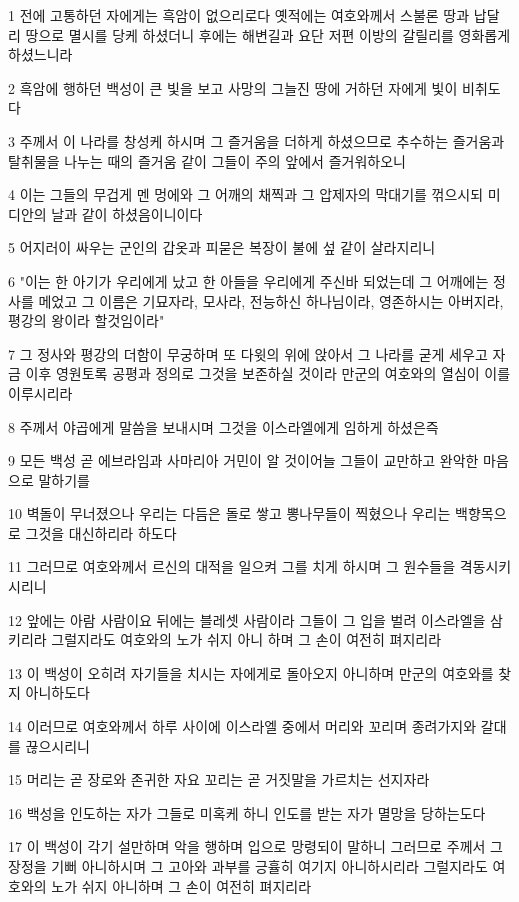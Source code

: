 \par 1 전에 고통하던 자에게는 흑암이 없으리로다 옛적에는 여호와께서 스불론 땅과 납달리 땅으로 멸시를 당케 하셨더니 후에는 해변길과 요단 저편 이방의 갈릴리를 영화롭게 하셨느니라
\par 2 흑암에 행하던 백성이 큰 빛을 보고 사망의 그늘진 땅에 거하던 자에게 빛이 비취도다
\par 3 주께서 이 나라를 창성케 하시며 그 즐거움을 더하게 하셨으므로 추수하는 즐거움과 탈취물을 나누는 때의 즐거움 같이 그들이 주의 앞에서 즐거워하오니
\par 4 이는 그들의 무겁게 멘 멍에와 그 어깨의 채찍과 그 압제자의 막대기를 꺾으시되 미디안의 날과 같이 하셨음이니이다
\par 5 어지러이 싸우는 군인의 갑옷과 피묻은 복장이 불에 섶 같이 살라지리니
\par 6 "이는 한 아기가 우리에게 났고 한 아들을 우리에게 주신바 되었는데 그 어깨에는 정사를 메었고 그 이름은 기묘자라, 모사라, 전능하신 하나님이라, 영존하시는 아버지라, 평강의 왕이라 할것임이라"
\par 7 그 정사와 평강의 더함이 무궁하며 또 다윗의 위에 앉아서 그 나라를 굳게 세우고 자금 이후 영원토록 공평과 정의로 그것을 보존하실 것이라 만군의 여호와의 열심이 이를 이루시리라
\par 8 주께서 야곱에게 말씀을 보내시며 그것을 이스라엘에게 임하게 하셨은즉
\par 9 모든 백성 곧 에브라임과 사마리아 거민이 알 것이어늘 그들이 교만하고 완악한 마음으로 말하기를
\par 10 벽돌이 무너졌으나 우리는 다듬은 돌로 쌓고 뽕나무들이 찍혔으나 우리는 백향목으로 그것을 대신하리라 하도다
\par 11 그러므로 여호와께서 르신의 대적을 일으켜 그를 치게 하시며 그 원수들을 격동시키시리니
\par 12 앞에는 아람 사람이요 뒤에는 블레셋 사람이라 그들이 그 입을 벌려 이스라엘을 삼키리라 그럴지라도 여호와의 노가 쉬지 아니 하며 그 손이 여전히 펴지리라
\par 13 이 백성이 오히려 자기들을 치시는 자에게로 돌아오지 아니하며 만군의 여호와를 찾지 아니하도다
\par 14 이러므로 여호와께서 하루 사이에 이스라엘 중에서 머리와 꼬리며 종려가지와 갈대를 끊으시리니
\par 15 머리는 곧 장로와 존귀한 자요 꼬리는 곧 거짓말을 가르치는 선지자라
\par 16 백성을 인도하는 자가 그들로 미혹케 하니 인도를 받는 자가 멸망을 당하는도다
\par 17 이 백성이 각기 설만하며 악을 행하며 입으로 망령되이 말하니 그러므로 주께서 그 장정을 기뻐 아니하시며 그 고아와 과부를 긍휼히 여기지 아니하시리라 그럴지라도 여호와의 노가 쉬지 아니하며 그 손이 여전히 펴지리라
